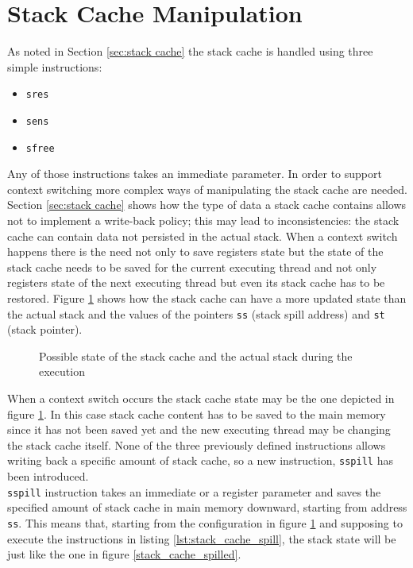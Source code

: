 \section{Stack Cache Manipulation}

As noted in Section \ref{sec:stack cache} the stack cache is handled using three simple instructions:
\begin{itemize}
	\item \texttt{sres} 
	\item \texttt{sens}
	\item \texttt{sfree}
\end{itemize}

Any of those instructions takes an immediate parameter. In order to support context switching more complex ways of manipulating the stack cache are needed. Section \ref{sec:stack cache} shows how the type of data a stack cache contains allows not to implement a write-back policy; this may lead to inconsistencies: the stack cache can contain data not persisted in the actual stack. When a context switch happens there is the need not only to save registers state but the state of the stack cache needs to be saved for the current executing thread and not only registers state of the next executing thread but even its stack cache has to be restored. Figure \ref{stack_cache_inconsistency} shows how the stack cache can have a more updated state than the actual stack and the values of the pointers \texttt{ss} (stack spill address) and \texttt{st} (stack pointer).


	\begin{figure}[!ht]
		\begin{center}
		\end{center}
		\caption{Possible state of the stack cache and the actual stack during the execution}
		\label{stack_cache_inconsistency}
	\end{figure}

When a context switch occurs the stack cache state may be the one depicted in figure \ref{stack_cache_inconsistency}. In this case stack cache content has to be saved to the main memory since it has not been saved yet and the new executing thread may be changing the stack cache itself. None of the three previously defined instructions allows writing back a specific amount of stack cache, so a new instruction, \texttt{sspill} has been introduced.\\ 

\texttt{sspill} instruction takes an immediate or a register parameter and saves the specified amount of stack cache in main memory downward, starting from address \texttt{ss}. This means that, starting from the configuration in figure \ref{stack_cache_inconsistency} and supposing to execute the instructions in listing \ref{lst:stack_cache_spill}, the stack state will be just like the one in figure \ref{stack_cache_spilled}.

